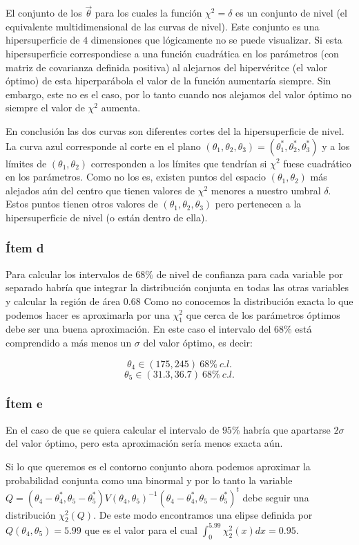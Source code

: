 El conjunto de los $\vec \theta$ para los cuales la función $\chi^2=\delta$ es un conjunto de nivel (el equivalente multidimensional de las curvas de nivel).
Este conjunto es una hipersuperficie de $4$ dimensiones que lógicamente no se puede visualizar.
Si esta hipersuperficie correspondiese a una función cuadrática en los parámetros (con matriz de covarianza definida positiva) al alejarnos del hipervéritce (el valor óptimo) de esta hiperparábola el valor de la función aumentaría siempre.
Sin embargo, este no es el caso, por lo tanto cuando nos alejamos del valor óptimo no siempre el valor de $\chi^2$ aumenta.

En conclusión las dos curvas son diferentes cortes del la hipersuperficie de nivel.
La curva azul corresponde al corte en el plano  $(\theta_1, \theta_2, \theta_3)=(\theta_1^*, \theta_2^*, \theta_3^*)$ y a los límites de $(\theta_1, \theta_2)$ corresponden a los límites que tendrían si $\chi^2$ fuese cuadrático en los parámetros.
Como no los es, existen puntos del espacio $(\theta_1, \theta_2)$ más alejados aún del centro que tienen valores de $\chi^2$ menores a nuestro umbral $\delta$.
Estos puntos tienen otros valores de $(\theta_1, \theta_2, \theta_3)$ pero pertenecen a la hipersuperficie de nivel (o están dentro de ella).

\subsubsection*{Ítem d}
Para calcular los intervalos de $68\%$ de nivel de confianza para cada variable por separado habría que integrar la distribución conjunta en todas las otras variables y calcular la región de área $0.68$
Como no conocemos la distribución exacta lo que podemos hacer es aproximarla por una $\chi^2_1$ que cerca de los parámetros óptimos debe ser una buena aproximación.
En este caso el intervalo del $68\%$ está comprendido a más menos un $\sigma$ del valor óptimo, es decir:

$$
\theta_4 \in (175, 245)\ 68\%\ c.l.
$$
$$
\theta_5 \in (31.3, 36.7) \ 68\%\ c.l.
$$

\subsubsection*{Ítem e}
En el caso de que se quiera calcular el intervalo de $95\%$ habría que apartarse $2\sigma$ del valor óptimo, pero esta aproximación sería menos exacta aún.

Si lo que queremos es el contorno conjunto ahora podemos aproximar la probabilidad conjunta como una binormal y por lo tanto la variable  $Q = (\theta_4-\theta_4^*, \theta_5-\theta_5^*) V(\theta_4, \theta_5)^{-1} (\theta_4-\theta_4^*, \theta_5-\theta_5^*)^t$ debe seguir una distribución $\chi^2_2(Q)$.
De este modo encontramos una elipse definida por $Q(\theta_4, \theta_5)=5.99$ que es el valor para el cual $\int_0^{5.99}\chi^2_2(x)dx=0.95$.

